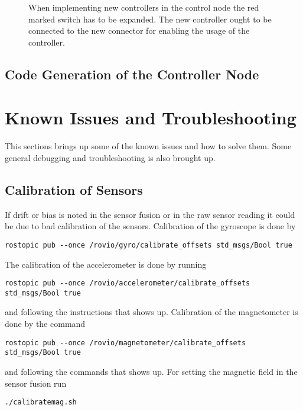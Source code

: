 \begin{figure}
\centering
{}
    \caption{When implementing new controllers in the control node the red marked switch has to be expanded. The new controller ought to be connected to the new connector for enabling the usage of the controller.}
    \label{fig:controller_simulink}
\end{figure}

\subsection{Code Generation of the Controller Node}


\section{Known Issues and Troubleshooting}
This sections brings up some of the known issues and how to solve them. Some general debugging and troubleshooting is also brought up.

\subsection{Calibration of Sensors}
If drift or bias is noted in the sensor fusion or in the raw sensor reading it could be due to bad calibration of the sensors.
Calibration of the gyroscope is done by
\begin{lstlisting}
rostopic pub --once /rovio/gyro/calibrate_offsets std_msgs/Bool true
\end{lstlisting}
The calibration of the accelerometer is done by running
\begin{lstlisting}
rostopic pub --once /rovio/accelerometer/calibrate_offsets std_msgs/Bool true
\end{lstlisting}
and following the instructions that shows up.
Calibration of the magnetometer is done by the command
\begin{lstlisting}
rostopic pub --once /rovio/magnetometer/calibrate_offsets std_msgs/Bool true
\end{lstlisting}
and following the commands that shows up.
For setting the magnetic field in the sensor fusion run 
\begin{lstlisting}
./calibratemag.sh
\end{lstlisting}


